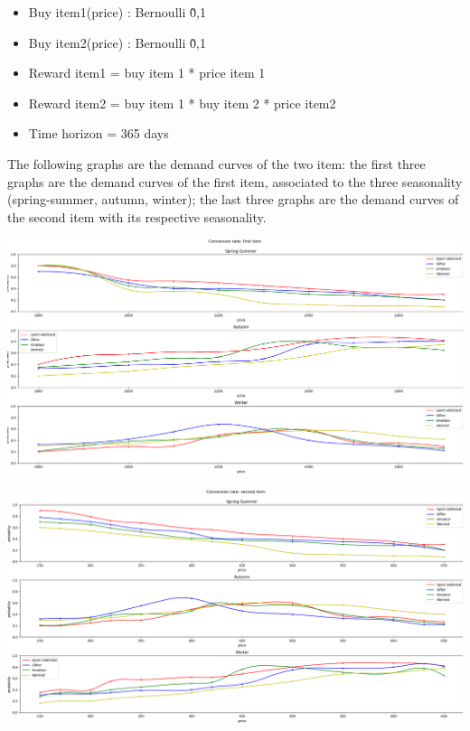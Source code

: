 \begin{itemize}
	\item Buy item1(price) : Bernoulli \~ 0,1
	\item Buy item2(price) : Bernoulli \~ 0,1
	\item Reward item1 = buy item 1 * price item 1
	\item Reward item2 = buy item 1 * buy item 2 * price item2
	\item Time horizon = 365 days
\end{itemize}
The following graphs are the demand curves of the two item: the first three graphs are the demand curves of the first item, associated to the three seasonality (spring-summer, autumn, winter); the last three graphs are the demand curves of the second item with its respective seasonality.
\begin{center}
	\includegraphics[scale=0.5]{Images/CR_fstItem}
\end{center}

\begin{center}
	\includegraphics[scale=0.5]{Images/CR_scndItem}
\end{center}


